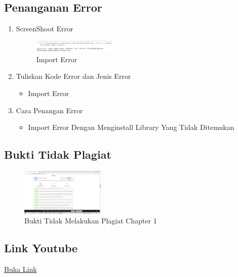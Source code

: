 \subsection{Penanganan Error}
\begin{enumerate}
	\item ScreenShoot Error
	\begin{figure}[H]
		\includegraphics[width=4cm]{figures/1174053/error.png}
		\centering
		\caption{Import Error}
	\end{figure}

	\item Tuliskan Kode Error dan Jenis Error
	\begin{itemize}
		\item Import Error
	\end{itemize}
	\item Cara Penangan Error
	\begin{itemize}
		\item Import Error
		\hfill\break
		Dengan Menginstall Library Yang Tidak Ditemukan
	\end{itemize}
\end{enumerate}

\subsection{Bukti Tidak Plagiat}
\begin{figure}[H]
	\includegraphics[width=4cm]{figures/1174053/plagiat.png}
	\centering
	\caption{Bukti Tidak Melakukan Plagiat Chapter 1}
\end{figure}

\subsection{Link Youtube}
\href{https://youtu.be/_DVBLBMLVRk}{Buka Link}

